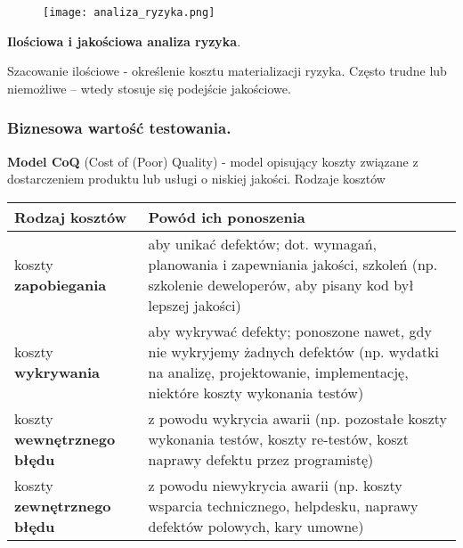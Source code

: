 \documentclass[../main.tex]{subfiles}
\begin{document}
    \begin{figure}[H]
        \texttt{[image: analiza\_ryzyka.png]}
    \end{figure}

    \textbf{Ilościowa i jakościowa analiza ryzyka}.

    Szacowanie ilościowe - określenie kosztu materializacji ryzyka. Często trudne lub niemożliwe – wtedy stosuje się podejście jakościowe.


    \subsubsection{Biznesowa wartość testowania.}

    \textbf{Model CoQ} (Cost of (Poor) Quality) - model opisujący koszty związane z dostarczeniem
    produktu lub usługi o niskiej jakości.
    Rodzaje kosztów

    \begin{table}[h]
\begin{center}
    \begin{tabular}{| p{5cm} | p{10cm} |}
        \hline
        \textbf{Rodzaj kosztów} & \textbf{Powód ich ponoszenia}\\
        \hline
        \hline
        koszty \textbf{zapobiegania} & aby unikać defektów; dot. wymagań, planowania i zapewniania jakości, szkoleń (np. szkolenie deweloperów, aby pisany kod był lepszej jakości)\\
        \hline
        koszty \textbf{wykrywania} & aby wykrywać defekty; ponoszone nawet, gdy nie wykryjemy żadnych defektów (np. wydatki na analizę, projektowanie, implementację, niektóre koszty wykonania testów)\\
        \hline
        koszty \textbf{wewnętrznego błędu} & z powodu wykrycia awarii (np. pozostałe koszty wykonania testów, koszty re-testów, koszt naprawy defektu przez programistę)\\
        \hline
        koszty \textbf{zewnętrznego błędu} & z powodu niewykrycia awarii (np. koszty wsparcia technicznego, helpdesku, naprawy defektów polowych, kary umowne)\\
        \hline
    \end{tabular}
\end{center}
\end{table}
\end{document}
